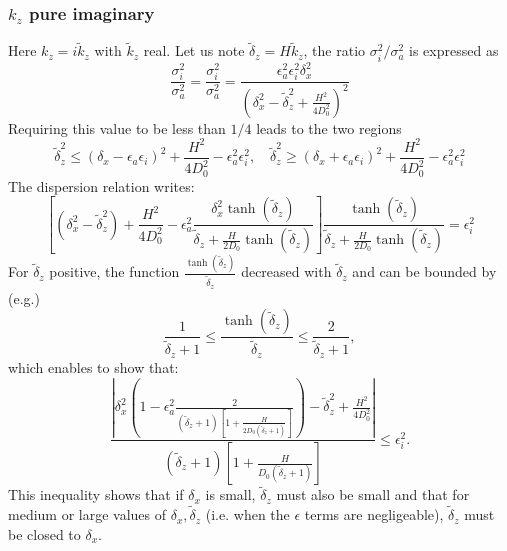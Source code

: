 \subsubsection{$k_z$ pure imaginary}
\label{insightskzimaginary}
Here $k_z=i\widetilde{k}_z$ with $\widetilde{k}_z$ real. Let us note $\widetilde{\delta}_z=H\widetilde{k}_z$, the ratio $\sigma_i^2/\sigma_a^2$ is expressed as
\[
\frac{\sigma_i^2}{\sigma_a^2}=\frac{\sigma_i^2}{\sigma_a^2}=\frac{\epsilon_a^2\epsilon_i^2\delta_x^2}{\left(\delta_x^2-\widetilde{\delta}_z^2+\frac{H^2}{4D_0^2}
\right)^2}
\]
Requiring this value to be less than $1/4$ leads to the two regions
\[
\widetilde{\delta}_z^2\le 
\left(
\delta_x-\epsilon_a\epsilon_i
\right)^2+\frac{H^2}{4D_0^2}-\epsilon_a^2\epsilon_i^2
,
\quad
\widetilde{\delta}_z^2\ge \left(
\delta_x+\epsilon_a\epsilon_i
\right)^2+\frac{H^2}{4D_0^2}-\epsilon_a^2\epsilon_i^2
\]
The dispersion relation writes:
\[
\left[
\left(\delta_x^2-\widetilde{\delta}_z^2\right)
+\frac{H^2}{4D_0^2}
-\epsilon_a^2
\frac{\delta_x^2\tanh(\widetilde{\delta}_z)}{\widetilde{\delta}_z+\frac{H}{2D_0}\tanh(\widetilde{\delta}_z)}
\right]\frac{\tanh(\widetilde{\delta}_z)}{\widetilde{\delta}_z+\frac{H}{2D_0}\tanh(\widetilde{\delta}_z)}=\epsilon_i^2
\]
For $\widetilde{\delta}_z$ positive, the function $\frac{\tanh(\widetilde{\delta}_z)}{\widetilde{\delta}_z}$ decreased with $\widetilde{\delta}_z$ and can be bounded by (e.g.)
\[
\frac{1}{\widetilde{\delta}_z+1}\le \frac{\tanh(\widetilde{\delta}_z)}{\widetilde{\delta}_z} \le \frac{2}{\widetilde{\delta}_z+1},
\]
which enables to show that:
\[
\frac{|\delta_x^2(1-\epsilon_a^2\frac{2}{(\widetilde{\delta}_z+1)\left[1+\frac{H}{2D_0(\widetilde{\delta}_z+1)}\right]})-\widetilde{\delta}_z^2+\frac{H^2}{4D_0^2}|}{(\widetilde{\delta}_z+1)\left[1+\frac{H}{D_0(\widetilde{\delta}_z+1)}\right]}\le \epsilon_i^2
.
\]
This inequality shows that if $\delta_x$ is small, $\widetilde{\delta}_z$ must also be small and that for medium or large values of $\delta_x, \widetilde{\delta}_z$ (i.e. when the $\epsilon$ terms are negligeable), $\widetilde{\delta}_z$ must be closed to $\delta_x$.
